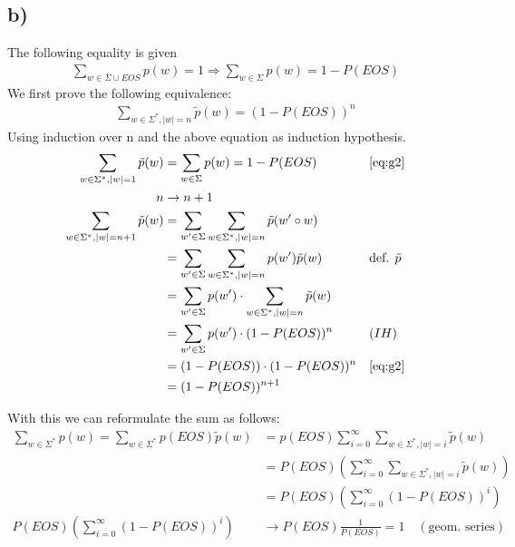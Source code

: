 \documentclass[a4paper,12pt]{ETHexercise}
\begin{document}
\subsection*{b)}
The following equality is given
\begin{align}
    \sum_{w \in \Sigma \cup EOS} p(w) = 1 \Rightarrow \sum_{w \in \Sigma} p(w) = 1 - P(EOS) \label{eq:g2}
\end{align}
We first prove the following equivalence:
\begin{align}
    \sum_{w \in \Sigma^*, |w| = n} \tilde{p}(w) = (1 - P(EOS))^n
\end{align}
Using induction over n and the above equation as induction hypothesis.
\begin{align}
    \sum_{w \in \Sigma^*, |w| = 1} \tilde{p}(w) &= \sum_{w \in \Sigma} p(w) = 1 - P(EOS) &&\ref{eq:g2} \\
    n &\rightarrow n+1 \nonumber\\
    \sum_{w \in \Sigma^*, |w| = n+1} \tilde{p}(w) &=  \sum_{w' \in \Sigma}\sum_{w \in \Sigma^*, |w| = n} \tilde{p}(w' \circ w)\\
    &= \sum_{w' \in \Sigma}\sum_{w \in \Sigma^*, |w| = n} p(w')\tilde{p}(w) &&\text{def. }\tilde{p}\\
    &= \sum_{w' \in \Sigma}  p(w') \cdot \sum_{w \in \Sigma^*, |w| = n}\tilde{p}(w)\\
    &= \sum_{w' \in \Sigma}  p(w') \cdot (1-P(EOS))^n &&(IH)\\
    &=  (1-P(EOS)) \cdot (1-P(EOS))^n &&\ref{eq:g2}\\
    &= (1-P(EOS))^{n+1}
\end{align}

With this we can reformulate the sum as follows:
\begin{align}
    \sum_{w \in \Sigma^*} p(w) = \sum_{w \in \Sigma^*} p(EOS) \tilde{p}(w)  &= p(EOS) \sum_{i=0}^{\infty} \sum_{w \in \Sigma^*, |w| = i} \tilde{p}(w)\\
    &= P(EOS)  \left(\sum_{i=0}^{\infty} \sum_{w \in \Sigma^*, |w| = i} \tilde{p}(w)\right)\\
    &= P(EOS)  \left(\sum_{i=0}^{\infty} (1-P(EOS))^{i} \right)\\
     P(EOS) \left(  \sum_{i=0}^{\infty} (1-P(EOS))^{i} \right) &\rightarrow P(EOS)  \frac{1}{P(EOS)} = 1 \quad (\text{geom. series})
\end{align}
\end{document}
